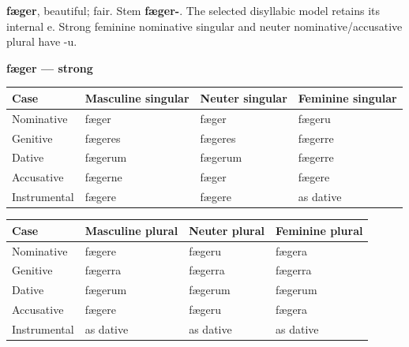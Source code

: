 \textbf{fæger}, beautiful; fair. Stem \textbf{fæger-}. The selected disyllabic model retains its internal e. Strong feminine nominative singular and neuter nominative/\allowbreak{}accusative plural have -u.

\textbf{fæger — strong}

\par\begingroup
\fontsize{10.5}{13.2}\selectfont
\setlength{\LTleft}{0pt}\setlength{\LTright}{\fill}
\noindent
\begin{tabular}{@{}>{\raggedright\arraybackslash}p{22.0mm}>{\raggedright\arraybackslash}p{31.188mm}>{\raggedright\arraybackslash}p{31.188mm}>{\raggedright\arraybackslash}p{31.188mm}@{}}
\toprule
\textbf{Case} & \textbf{Masculine singular} & \textbf{Neuter singular} & \textbf{Feminine singular} \\
\midrule
Nominative & fæger & fæger & fægeru \\
Genitive & fægeres & fægeres & fægerre \\
Dative & fægerum & fægerum & fægerre \\
Accusative & fægerne & fæger & fægere \\
Instrumental & fægere & fægere & as dative \\
\bottomrule
\end{tabular}
\par\endgroup
\par\addvspace{5pt}
\par\begingroup
\fontsize{10.5}{13.2}\selectfont
\setlength{\LTleft}{0pt}\setlength{\LTright}{\fill}
\noindent
\begin{tabular}{@{}>{\raggedright\arraybackslash}p{22.0mm}>{\raggedright\arraybackslash}p{31.188mm}>{\raggedright\arraybackslash}p{31.188mm}>{\raggedright\arraybackslash}p{31.188mm}@{}}
\toprule
\textbf{Case} & \textbf{Masculine plural} & \textbf{Neuter plural} & \textbf{Feminine plural} \\
\midrule
Nominative & fægere & fægeru & fægera \\
Genitive & fægerra & fægerra & fægerra \\
Dative & fægerum & fægerum & fægerum \\
Accusative & fægere & fægeru & fægera \\
Instrumental & as dative & as dative & as dative \\
\bottomrule
\end{tabular}
\par\endgroup


